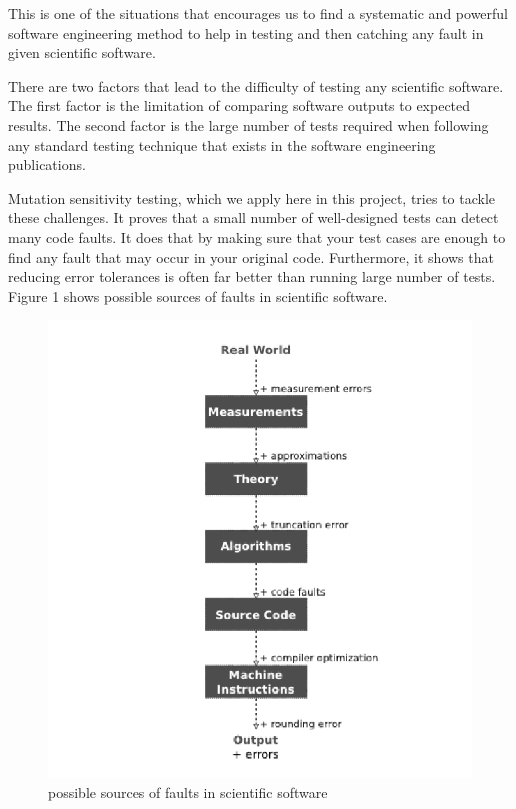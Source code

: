 \documentclass{acm_proc_article-sp}
\begin{document}
This is one of the situations that encourages us to find a systematic and powerful software engineering method to help in testing and then catching any fault in given scientific software.

There are two factors that lead to the difficulty of testing any scientific software. The first factor is the limitation of comparing software outputs to expected results. The second factor is the large number of tests required when following any standard testing technique that exists in the software engineering publications\cite{a2}.

Mutation sensitivity testing, which we apply here in this project, tries to tackle these challenges. It proves that a small number of well-designed tests can detect many code faults. It does that by making sure that your test cases are enough to find any fault that may occur in your original code. Furthermore, it shows that reducing error tolerances is often far better than running large number of tests. Figure 1 shows possible sources of faults in scientific software.

\begin{figure}[h]
\caption{possible sources of faults in scientific software \cite{a2}}
\includegraphics[scale=0.55]{fig1.png}
\end{figure}
\end{document}
